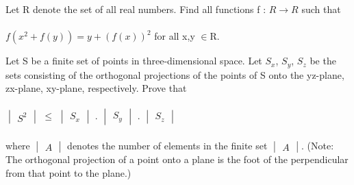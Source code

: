 \item Let R denote the set of all real numbers. Find all functions f : $R \rightarrow R$
such that\\
\\ $f(x^2+f(y))= y +(f(x))^2$ for all x,y $\in $R.

\item Let S be a finite set of points in three-dimensional space. Let $S_x$, $S_y$, $S_z$ be the sets consisting of the orthogonal projections of the points of S onto the yz-plane, zx-plane, xy-plane, respectively. Prove that\\
\\  $\begin{vmatrix} S^2 \end{vmatrix}$ $\leq$ $\begin{vmatrix} S_x \end{vmatrix}$ . $\begin{vmatrix} S_y \end{vmatrix}$ . $\begin{vmatrix} S_z \end{vmatrix}$\\
\\ where $\begin{vmatrix} A \end{vmatrix}$ denotes the number of elements in the finite set $\begin{vmatrix} A \end{vmatrix}$. (Note: The orthogonal projection of a point onto a plane is the foot of the perpendicular from that point to the plane.)



